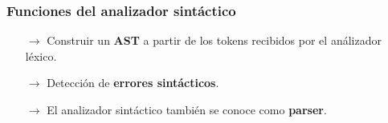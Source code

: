 \documentclass{beamer}
\begin{document}
		\begin{frame}
			\frametitle{Funciones del analizador sint\'actico}

            \begin{block}{}
                \begin{itemize}
                    \item[$\rightarrow$] Construir un \textbf{AST} a partir de los tokens recibidos por el an\'alizador l\'exico.
                \end{itemize}
            \end{block}
			\begin{block}{}
                \begin{itemize}
                    \item[$\rightarrow$] Detecci\'on de \textbf{errores sint\'acticos}.
                \end{itemize}
            \end{block}
            \begin{block}{}
                 \begin{itemize}
                    \item[$\rightarrow$] El analizador sint\'actico tambi\'en se conoce como \textbf{parser}.
                 \end{itemize}
            \end{block}
            \begin{figure}[H]
			    \begin{center}
			    \end{center}
			\end{figure}
		\end{frame}		
		
\end{document}
